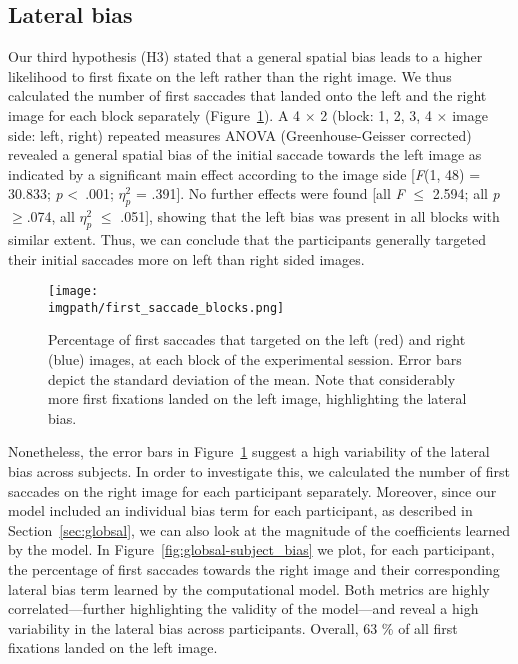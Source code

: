 {\subsection{Lateral bias}
\label{sec:results-spatialbias}
Our third hypothesis (H3) stated that a general spatial bias leads to a higher likelihood to first fixate on the left rather than the right image. We thus calculated the number of first saccades that landed onto the left and the right image for each block separately (Figure~\ref{fig:globsal-first_saccade_blocks}). A 4 $\times$ 2 (block: 1, 2, 3, 4 $\times$ image side: left, right) repeated measures ANOVA (Greenhouse-Geisser corrected) revealed a general spatial bias of the initial saccade towards the left image as indicated by a significant main effect according to the image side [\textit{F}(1, 48) = 30.833; \textit{p} \textless\ .001; \textit{$\eta_p^2$} = .391]. No further effects were found [all \textit{F} $\leq$ 2.594; all \textit{p} $\geq$.074, all \textit{$\eta_p^2$} $\leq$ .051], showing that the left bias was present in all blocks with similar extent. Thus, we can conclude that the participants generally targeted their initial saccades more on left than right sided images.

\begin{figure}[ht]
  \centering
  \texttt{[image: \\imgpath/first\_saccade\_blocks.png]}
  \caption{Percentage of first saccades that targeted on the left (red) and right (blue) images, at each block of the experimental session. Error bars depict the standard deviation of the mean. Note that considerably more first fixations landed on the left image, highlighting the lateral bias.}
\label{fig:globsal-first_saccade_blocks}
\end{figure}

Nonetheless, the error bars in Figure~\ref{fig:globsal-first_saccade_blocks} suggest a high variability of the lateral bias across subjects. In order to investigate this, we calculated the number of first saccades on the right image for each participant separately. Moreover, since our model included an individual bias term for each participant, as described in Section~\ref{sec:globsal}, we can also look at the magnitude of the coefficients learned by the model. In Figure~\ref{fig:globsal-subject_bias} we plot, for each participant, the percentage of first saccades towards the right image and their corresponding lateral bias term learned by the computational model. Both metrics are highly correlated---further highlighting the validity of the model---and reveal a high variability in the lateral bias across participants. Overall, 63 \% of all first fixations landed on the left image.

}
